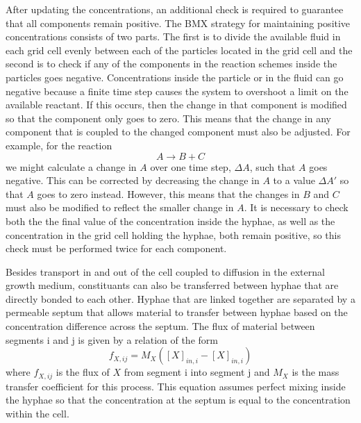 \documentclass[12pt]{article}
\begin{document}
After updating the concentrations, an additional check is required to guarantee
that all components remain positive.
The BMX strategy for maintaining positive concentrations consists of two parts.
The first is to divide the available fluid in each grid cell evenly between each
of the particles located in the grid cell and the second is to check if any of the
components in the reaction schemes inside the particles goes negative.
Concentrations inside the particle or in the fluid can go negative because a
finite time step causes the system to overshoot a limit on the available reactant.
If this occurs, then the change in that component is modified so that the component
only goes to zero. This means that the change in any component that is coupled to
the changed component must also be adjusted. For example, for the reaction
\[
A \longrightarrow B + C
\]
we might calculate a change in $A$ over one time step, $\Delta A$, such that $A$
goes negative. This can be corrected by decreasing the change in $A$ to a value
$\Delta A'$ so that $A$ goes to zero instead. However, this means that the changes
in $B$ and $C$ must also be modified to reflect the smaller change in $A$.
It is necessary to check both the the final value of the concentration inside
the hyphae, as well as the concentration in the grid cell holding the hyphae,
both remain positive, so this check must be performed twice for each component.

Besides transport in and out of the cell coupled to diffusion in the external
growth medium, constituants can also be transferred between hyphae that are directly
bonded to each other. Hyphae that are linked together are separated by a permeable septum
that allows material to transfer between hyphae based on the concentration difference
across the septum. The flux of material between segments i and j is given by a relation
of the form
\[
f_{X,ij} = M_X ([X]_{in,i}-[X]_{in,i})
\]
where $f_{X,ij}$ is the flux of $X$ from segment i into segment j and $M_X$ is the mass
transfer coefficient for this process. This equation assumes perfect mixing inside the hyphae
so that the concentration at the septum is equal to the concentration within the cell.
\end{document}
